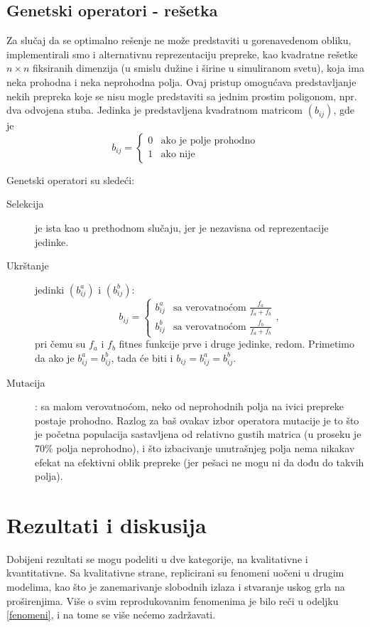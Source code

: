 \documentclass[12pt]{article}
\begin{document}
\subsection{Genetski operatori - rešetka}

Za slučaj da se optimalno rešenje ne može predstaviti u gorenavedenom obliku, implementirali smo i alternativnu reprezentaciju prepreke, kao kvadratne rešetke $n\times n$ fiksiranih dimenzija (u smislu dužine i širine u simuliranom svetu), koja ima neka prohodna i neka neprohodna polja. Ovaj pristup omogućava predstavljanje nekih prepreka koje se nisu mogle predstaviti sa jednim prostim poligonom, npr. dva odvojena stuba. Jedinka je predstavljena kvadratnom matricom $(b_{ij})$, gde je
$$
b_{ij} = 
\begin{cases}
    0 & \text{ako je polje prohodno}\\
    1 & \text{ako nije}
\end{cases}
$$

Genetski operatori su sledeći:
\begin{description}
\item[Selekcija] je ista kao u prethodnom slučaju, jer je nezavisna od reprezentacije jedinke.
\item[Ukrštanje] jedinki $(b^a_{ij})$ i $(b^b_{ij})$:
$$
b_{ij} = 
\begin{cases}
    b^a_{ij} & \text{sa verovatnoćom } \frac{f_a}{f_a+f_b}\\
    b^b_{ij} & \text{sa verovatnoćom } \frac{f_b}{f_a+f_b}
\end{cases},
$$
pri čemu su $f_a$ i $f_b$ fitnes funkcije prve i druge jedinke, redom. Primetimo da ako je $ b^a_{ij} = b^b_{ij}$, tada će biti i $b_{ij} = b^a_{ij} = b^b_{ij}$.
\item[Mutacija]: sa malom verovatnoćom, neko od neprohodnih polja na ivici prepreke postaje prohodno. Razlog za baš ovakav izbor operatora mutacije je to što je početna populacija sastavljena od relativno gustih matrica (u proseku je $70\%$ polja neprohodno), i što izbacivanje unutrašnjeg polja nema nikakav efekat na efektivni oblik prepreke (jer pešaci ne mogu ni da dođu do takvih polja).
\end{description}

\section{Rezultati i diskusija}

Dobijeni rezultati se mogu podeliti u dve kategorije, na kvalitativne i kvantitativne. Sa kvalitativne strane, replicirani su fenomeni uočeni u drugim modelima, kao što je zanemarivanje slobodnih izlaza i stvaranje uskog grla na proširenjima. Više o svim reprodukovanim fenomenima je bilo reči u odeljku \ref{fenomeni}, i na tome se više nećemo zadržavati.
\end{document}
